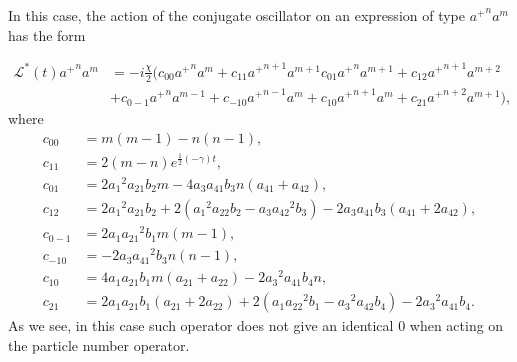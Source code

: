 \documentclass[12pt]{article}
\theoremstyle{definition}
\begin{document}
	In this case, the action of the conjugate oscillator on an expression of type ${a^+}^na^m$ has the form
	
	\begin{align}
		\label{eq:ActOfGenOnExpr}
		\mathcal{L}^*(t){a^+}^na^m &= -i\frac{\chi}{2}(c_{00}{a^+}^na^m + c_{11}{a^+}^{n+1}a^{m+1} c_{01}{a^+}^na^{m + 1} + c_{12}{a^+}^{n + 1}a^{m + 2} \nonumber\\&+ c_{0-1}{a^+}^na^{m-1} + c_{-10}{a^+}^{n - 1}a^m + c_{10}{a^+}^{n+1}a^m + c_{21}{a^+}^{n+2}a^{m+1}),
	\end{align}
	where
	\begin{align*}
		c_{00} &= m (m-1)-n (n-1),\\
		c_{11} &= 2 (m-n) e^{\frac{1}{2} (-\gamma ) t},\\
		c_{01} &= 2 {a_1}^2 {a_{21}} {b_2} m-4 {a_3} {a_{41}} {b_3} n ({a_{41}}+{a_{42}}),\\
		c_{12} &= 2 {a_1}^2 {a_{21}} {b_2}+2 \left({a_1}^2 {a_{22}} {b_2}-{a_3} {a_{42}}^2 {b_3}\right)-2 {a_3} {a_{41}} {b_3} ({a_{41}}+2 {a_{42}}),\\
		c_{0-1} &= 2 {a_1} {a_{21}}^2 {b_1} m (m-1),\\
		c_{-10} &=-2 {a_3} {a_{41}}^2 {b_3} n (n-1),\\
		c_{10} &= 4 {a_1} {a_{21}} {b_1} m ({a_{21}}+{a_{22}})-2 {a_3}^2 {a_{41}} {b_4} n,\\
		c_{21} &= 2 {a_1} {a_{21}} {b_1} ({a_{21}}+2 {a_{22}})+2 \left({a_1} {a_{22}}^2 {b_1}-{a_3}^2 {a_{42}} {b_4}\right)-2 {a_3}^2 {a_41} {b_4}.
	\end{align*}
	As we see, in this case such operator does not give an identical 0 when acting on the particle number operator.
	
	
	
\end{document}
